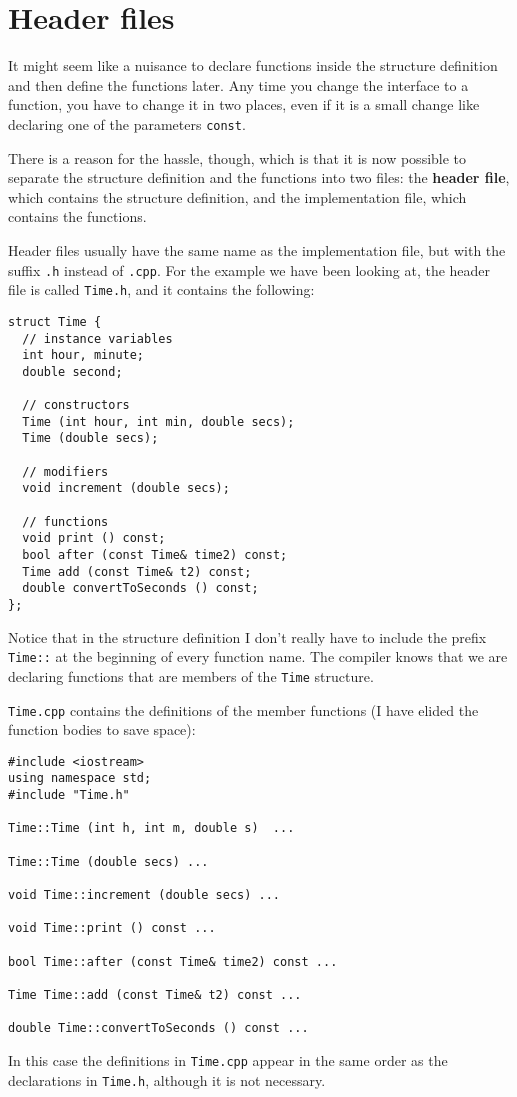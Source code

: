\section {Header files}

It might seem like a nuisance to declare functions inside
the structure definition and then define the functions later.
Any time you change the interface to a function, you have
to change it in two places, even if it is a small change
like declaring one of the parameters {\tt const}.

There is a reason for the hassle, though, which is that it
is now possible to separate the structure definition and the
functions into two files: the {\bf header file},
which contains the structure definition, and the implementation
file, which contains the functions.

Header files usually have the same name as the implementation
file, but with the suffix {\tt .h} instead of {\tt .cpp}.  For
the example we have been looking at, the header file is called
{\tt Time.h}, and it contains the following:

\begin{verbatim}
struct Time {
  // instance variables
  int hour, minute;
  double second;

  // constructors
  Time (int hour, int min, double secs);
  Time (double secs);

  // modifiers
  void increment (double secs);

  // functions
  void print () const;
  bool after (const Time& time2) const;
  Time add (const Time& t2) const;
  double convertToSeconds () const;
};
\end{verbatim}
%
Notice that in the structure definition I don't really have
to include the prefix {\tt Time::} at the beginning of every
function name.  The compiler knows that we are declaring functions
that are members of the {\tt Time} structure.

{\tt Time.cpp} contains the definitions of the member functions
(I have elided the function bodies to save space):

\begin{verbatim}
#include <iostream>
using namespace std;
#include "Time.h"

Time::Time (int h, int m, double s)  ...

Time::Time (double secs) ...

void Time::increment (double secs) ...

void Time::print () const ...

bool Time::after (const Time& time2) const ...

Time Time::add (const Time& t2) const ...

double Time::convertToSeconds () const ...
\end{verbatim}
%
In this case the definitions in {\tt Time.cpp} appear in the
same order as the declarations in {\tt Time.h}, although it
is not necessary.

